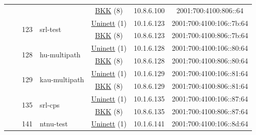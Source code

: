 \begin{small}
\begin{center}
\begin{longtable}{|c|c|c|c|c|c|c|c|}
  &  & \multicolumn{2}{|c|}{} & \multicolumn{2}{|c|}{\tiny{\href{http://bkk.no}{BKK} (8)}} & \tiny{10.8.6.100} & \tiny{2001:700:4100:806::64} \\* \cline{3-3}\cline{4-4}\cline{5-5}\cline{6-6}\cline{7-7}\cline{8-8}
  &  & \multirow{2}{*}{\tiny{123}} & \multicolumn{1}{|l|}{\multirow{2}{*}{\tiny{srl-test}}} & \multicolumn{2}{|c|}{\tiny{\href{https://www.uninett.no}{Uninett} (1)}} & \tiny{10.1.6.123} & \tiny{2001:700:4100:106::7b:64} \\* \cline{5-5}\cline{6-6}\cline{7-7}\cline{8-8}
  &  &  &  & \multicolumn{2}{|c|}{\tiny{\href{http://bkk.no}{BKK} (8)}} & \tiny{10.8.6.123} & \tiny{2001:700:4100:806::7b:64} \\* \cline{3-3}\cline{4-4}\cline{5-5}\cline{6-6}\cline{7-7}\cline{8-8}
  &  & \multirow{2}{*}{\tiny{128}} & \multicolumn{1}{|l|}{\multirow{2}{*}{\tiny{hu-multipath}}} & \multicolumn{2}{|c|}{\tiny{\href{https://www.uninett.no}{Uninett} (1)}} & \tiny{10.1.6.128} & \tiny{2001:700:4100:106::80:64} \\* \cline{5-5}\cline{6-6}\cline{7-7}\cline{8-8}
  &  &  &  & \multicolumn{2}{|c|}{\tiny{\href{http://bkk.no}{BKK} (8)}} & \tiny{10.8.6.128} & \tiny{2001:700:4100:806::80:64} \\* \cline{3-3}\cline{4-4}\cline{5-5}\cline{6-6}\cline{7-7}\cline{8-8}
  &  & \multirow{2}{*}{\tiny{129}} & \multicolumn{1}{|l|}{\multirow{2}{*}{\tiny{kau-multipath}}} & \multicolumn{2}{|c|}{\tiny{\href{https://www.uninett.no}{Uninett} (1)}} & \tiny{10.1.6.129} & \tiny{2001:700:4100:106::81:64} \\* \cline{5-5}\cline{6-6}\cline{7-7}\cline{8-8}
  &  &  &  & \multicolumn{2}{|c|}{\tiny{\href{http://bkk.no}{BKK} (8)}} & \tiny{10.8.6.129} & \tiny{2001:700:4100:806::81:64} \\* \cline{3-3}\cline{4-4}\cline{5-5}\cline{6-6}\cline{7-7}\cline{8-8}
  &  & \multirow{2}{*}{\tiny{135}} & \multicolumn{1}{|l|}{\multirow{2}{*}{\tiny{srl-cps}}} & \multicolumn{2}{|c|}{\tiny{\href{https://www.uninett.no}{Uninett} (1)}} & \tiny{10.1.6.135} & \tiny{2001:700:4100:106::87:64} \\* \cline{5-5}\cline{6-6}\cline{7-7}\cline{8-8}
  &  &  &  & \multicolumn{2}{|c|}{\tiny{\href{http://bkk.no}{BKK} (8)}} & \tiny{10.8.6.135} & \tiny{2001:700:4100:806::87:64} \\* \cline{3-3}\cline{4-4}\cline{5-5}\cline{6-6}\cline{7-7}\cline{8-8}
  &  & \multirow{2}{*}{\tiny{141}} & \multicolumn{1}{|l|}{\multirow{2}{*}{\tiny{ntnu-test}}} & \multicolumn{2}{|c|}{\tiny{\href{https://www.uninett.no}{Uninett} (1)}} & \tiny{10.1.6.141} & \tiny{2001:700:4100:106::8d:64} \\* \cline{5-5}\cline{6-6}\cline{7-7}\cline{8-8}

\end{longtable}
\end{center}
\end{small}
